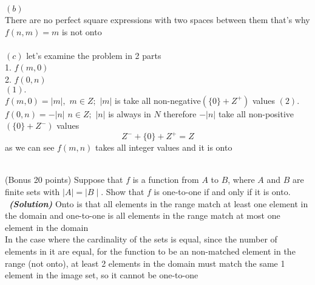 \documentclass[a4 paper]{article}
\numberwithin{equation}{section}
\newcommand{\problem}[2]{~\\\fbox{\textbf{Problem #1}}\hfill (#2 points)\newline\newline}
\newcommand{\solution}{~\newline\textbf{\textit{(Solution)}} }
\newcommand{\0}{\mathbf{0}}
\begin{document}
$(b)$ \\\hspace{20}There are no perfect square expressions with two spaces between them that's why $f(n,m) = m$ is not onto \\~\\

$(c)$ let's examine the problem in 2 parts  \\\hspace{10} 1. $f(m,0)$  \\\hspace{10} 2. $f(0,n)$ \\ 
$(1).$ \\\hspace{10} $f(m,0) = |m|,$ $m\in Z;$ $|m|$ is take all non-negative$(\{0\} + Z^+)$ values  
$(2).$ \\\hspace{10} $f(0,n) = -|n|$ $n\in Z;$ $|n|$ is always in $N$ therefore $-|n|$ take all non-positive$(\{0\} + Z^-)$ values  
\[ Z^- + \{0\} + Z^+ = Z\] as we can see  $f(m,n)$ takes all integer values and it is onto

\newpage
\problem{7: Functions}{Bonus 20}
Suppose that $f$ is a function from $A$ to $B$, where $A$ and $B$ are finite sets with $\mid A\mid=\mid B\mid$. Show that $f$ is one-to-one if and only if it is onto.\\
\solution
\newline
\newline
Onto is that all elements in the range match at least one element in the domain
and one-to-one is all elements in the range match at most one element in the domain \\ 
In the case where the cardinality of the sets is equal, since the number of elements in it are equal, for the function to be an non-matched element in the range (not onto), at least 2 elements in the domain must match the same 1 element in the image set, so it cannot be one-to-one
\end{document}
